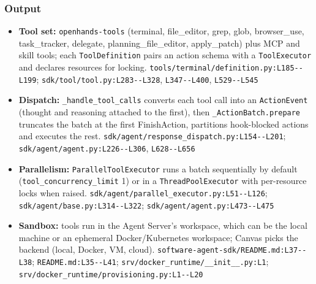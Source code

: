 \subsubsection*{Output}
\begin{itemize}
\item \textbf{Tool set:} \texttt{openhands-\allowbreak{}tools} (terminal, file\_editor, grep, glob, browser\_use, task\_tracker, delegate, planning\_file\_editor, apply\_patch) plus MCP and skill tools; each \texttt{ToolDefinition} pairs an action schema with a \texttt{ToolExecutor} and declares resources for locking. \texttt{tools/\allowbreak{}terminal/\allowbreak{}definition.\allowbreak{}py:\allowbreak{}L185-\allowbreak{}-\allowbreak{}L199}; \texttt{sdk/\allowbreak{}tool/\allowbreak{}tool.\allowbreak{}py:\allowbreak{}L283-\allowbreak{}-\allowbreak{}L328}, \texttt{L347-\allowbreak{}-\allowbreak{}L400}, \texttt{L529-\allowbreak{}-\allowbreak{}L545}
\item \textbf{Dispatch:} \texttt{\_\allowbreak{}handle\_\allowbreak{}tool\_\allowbreak{}calls} converts each tool call into an \texttt{ActionEvent} (thought and reasoning attached to the first), then \texttt{\_\allowbreak{}ActionBatch.\allowbreak{}prepare} truncates the batch at the first FinishAction, partitions hook-blocked actions and executes the rest. \texttt{sdk/\allowbreak{}agent/\allowbreak{}response\_\allowbreak{}dispatch.\allowbreak{}py:\allowbreak{}L154-\allowbreak{}-\allowbreak{}L201}; \texttt{sdk/\allowbreak{}agent/\allowbreak{}agent.\allowbreak{}py:\allowbreak{}L226-\allowbreak{}-\allowbreak{}L306}, \texttt{L628-\allowbreak{}-\allowbreak{}L656}
\item \textbf{Parallelism:} \texttt{ParallelToolExecutor} runs a batch sequentially by default (\texttt{tool\_\allowbreak{}concurrency\_\allowbreak{}limit} 1) or in a \texttt{ThreadPoolExecutor} with per-resource locks when raised. \texttt{sdk/\allowbreak{}agent/\allowbreak{}parallel\_\allowbreak{}executor.\allowbreak{}py:\allowbreak{}L51-\allowbreak{}-\allowbreak{}L126}; \texttt{sdk/\allowbreak{}agent/\allowbreak{}base.\allowbreak{}py:\allowbreak{}L314-\allowbreak{}-\allowbreak{}L322}; \texttt{sdk/\allowbreak{}agent/\allowbreak{}agent.\allowbreak{}py:\allowbreak{}L473-\allowbreak{}-\allowbreak{}L475}
\item \textbf{Sandbox:} tools run in the Agent Server's workspace, which can be the local machine or an ephemeral Docker/Kubernetes workspace; Canvas picks the backend (local, Docker, VM, cloud). \texttt{software-\allowbreak{}agent-\allowbreak{}sdk/\allowbreak{}README.\allowbreak{}md:\allowbreak{}L37-\allowbreak{}-\allowbreak{}L38}; \texttt{README.\allowbreak{}md:\allowbreak{}L35-\allowbreak{}-\allowbreak{}L41}; \texttt{srv/\allowbreak{}docker\_\allowbreak{}runtime/\allowbreak{}\_\allowbreak{}\_\allowbreak{}init\_\allowbreak{}\_\allowbreak{}.\allowbreak{}py:\allowbreak{}L1}; \texttt{srv/\allowbreak{}docker\_\allowbreak{}runtime/\allowbreak{}provisioning.\allowbreak{}py:\allowbreak{}L1-\allowbreak{}-\allowbreak{}L20}

\end{itemize}
